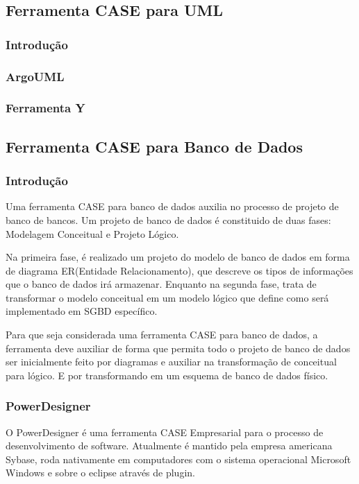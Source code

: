 \documentclass[12pt,a4paper]{article}
\begin{document}
	\subsection{Ferramenta CASE para UML}
		\subsubsection{Introdução}
		\subsubsection{ArgoUML}
		\subsubsection{Ferramenta Y}

	\subsection{Ferramenta CASE para Banco de Dados}
		\subsubsection{Introdução}
			Uma ferramenta CASE para banco de dados auxilia no processo de projeto de banco de bancos. Um projeto de banco de
			dados é constituido de duas fases: Modelagem Conceitual e Projeto Lógico. 
			
			Na primeira fase, é realizado um projeto do modelo de banco de dados em forma de diagrama ER(Entidade
			Relacionamento), que descreve os tipos de informações que o banco de dados irá armazenar. Enquanto na segunda fase,
			trata de transformar o modelo conceitual em um modelo lógico que define como será implementado em SGBD específico.
			
			Para que seja considerada uma ferramenta CASE para banco de dados, a ferramenta deve auxiliar de forma que permita
			todo o projeto de banco de dados ser inicialmente feito por diagramas e auxiliar na transformação de conceitual para
			lógico. E por transformando em um esquema de banco de dados físico.
			
		\subsubsection{PowerDesigner}
			O PowerDesigner é uma ferramenta CASE Empresarial para o processo de desenvolvimento de software. Atualmente é
			mantido pela empresa americana Sybase, roda nativamente em computadores com o sistema operacional Microsoft Windows
			e sobre o eclipse através de plugin.
			
\end{document}
